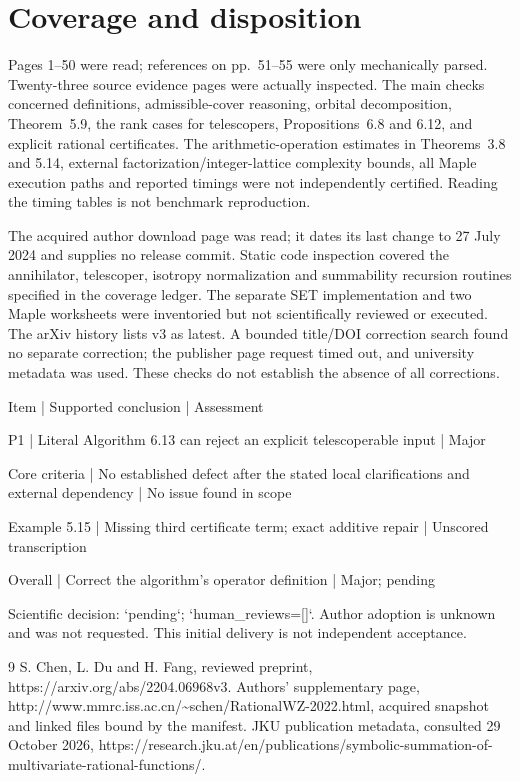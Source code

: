 \documentclass[10pt]{article}
\begin{document}
\section*{Coverage and disposition}
Pages 1–50 were read; references on pp. 51–55 were only mechanically parsed. Twenty-three source evidence pages were actually inspected. The main checks concerned definitions, admissible-cover reasoning, orbital decomposition, Theorem 5.9, the rank cases for telescopers, Propositions 6.8 and 6.12, and explicit rational certificates. The arithmetic-operation estimates in Theorems 3.8 and 5.14, external factorization/integer-lattice complexity bounds, all Maple execution paths and reported timings were not independently certified. Reading the timing tables is not benchmark reproduction.\par
The acquired author download page was read; it dates its last change to 27 July 2024 and supplies no release commit. Static code inspection covered the annihilator, telescoper, isotropy normalization and summability recursion routines specified in the coverage ledger. The separate SET implementation and two Maple worksheets were inventoried but not scientifically reviewed or executed. The arXiv history lists v3 as latest. A bounded title/DOI correction search found no separate correction; the publisher page request timed out, and university metadata was used. These checks do not establish the absence of all corrections.\par
Item | Supported conclusion | Assessment\par
P1 | Literal Algorithm 6.13 can reject an explicit telescoperable input | Major\par
Core criteria | No established defect after the stated local clarifications and external dependency | No issue found in scope\par
Example 5.15 | Missing third certificate term; exact additive repair | Unscored transcription\par
Overall | Correct the algorithm’s operator definition | Major; pending\par
Scientific decision: `pending`; `human\_reviews=[]`. Author adoption is unknown and was not requested. This initial delivery is not independent acceptance.\par
9 S. Chen, L. Du and H. Fang, reviewed preprint, https://arxiv.org/abs/2204.06968v3. Authors’ supplementary page, http://www.mmrc.iss.ac.cn/\textasciitilde{}schen/RationalWZ-2022.html, acquired snapshot and linked files bound by the manifest. JKU publication metadata, consulted 29 October 2026, https://research.jku.at/en/publications/symbolic-summation-of-multivariate-rational-functions/.\par
\end{document}

